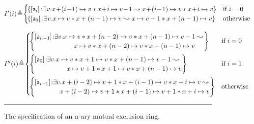 \begin{figure}
\[\begin{array}{@{} l @{}}
\begin{array}{@{} l @{}}
	I'(i) \!\eqdef\! 
	\begin{cases}
		\!\left\{
			[\token{a}_{i}]\!:\! \exsts{v}\!\cell{x \!+\! (i\!-\!1)}{v} * \cell{x \!+\! i}{v\!-\!1} \swap \cell{x \!+\! (i\!-\!1)}{v} * \cell{x \!+\! i}{v}
		\right\}
		& \text{if } i = 0\\
		
		\!\left\{
			[\token{a}_{0}]\!:\! \exsts{v}\!\cell{x}{v} * \cell{x + (n-1)}{v} \swap \cell{x}{v+1} * \cell{x + (n-1)}{v}
		\right\}
		& \text{otherwise}
	\end{cases}\\\\
	
	I''(i) \!\eqdef\! 
	\begin{cases}
		\!\left\{
			\begin{array}{@{} l @{} l @{}}
				[\token{a}_{n-1}]\!: & \exsts{v}\! \cell{x}{v} * \cell{x + (n-2)}{v} * \cell{x + (n-1)}{v-1} \swap\\
				& \quad\qquad \cell{x}{v} * \cell{x + (n-2)}{v} * \cell{x + (n-1)}{v}
			\end{array}
		\right\}
		& \text{if } i = 0  \vspace*{5pt}\\
		
		\!\left\{
			\begin{array}{@{} l @{} l @{}}
				[\token{a}_{0}]\!: & \exsts{v}\! \cell{x}{v} * \cell{x + 1}{v} * \cell{x + (n-1)}{v-1} \swap\\
				& \quad\qquad \cell{x}{v+1} * \cell{x + 1}{v} * \cell{x + (n-1)}{v}
			\end{array}
		\right\}
		& \text{if } i = 1 \vspace*{5pt}\\
		
		\!\left\{
			\begin{array}{@{} l @{} l @{}}
				[\token{a}_{i-1}]\!: & \exsts{v}\! \cell{x + (i-2)}{v+1} * \cell{x + (i-1)}{v} * \cell{x + i}{v} \swap\\
				& \quad \cell{x + (i-2)}{v+1} * \cell{x + (i-1)}{v+1} * \cell{x + i}{v}
			\end{array}
		\right\}
		& \text{otherwise}
	\end{cases}\\
\end{array}
\end{array}
\]
\hrule
%
\caption{The \colosl specification of an n-ary mutual exclusion ring.}
\label{fig:n-place-ring-spec}
\end{figure}
%
%

